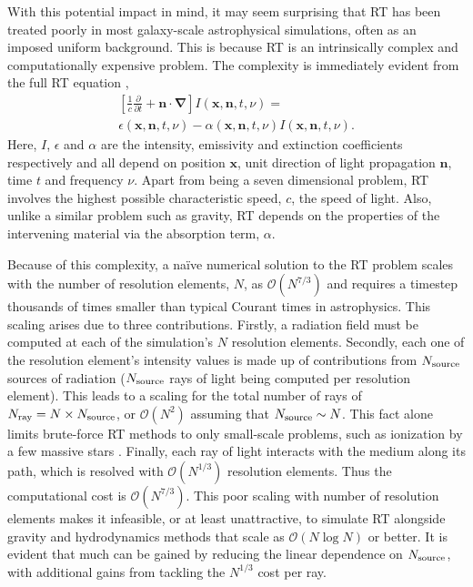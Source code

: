 \documentclass[fleq,usenatbib]{mnras}
\newcommand{\bigO}[1]{\mathcal{O}\left(#1\right)}
\newcommand{\NS}{N_{\rm source}}
\newcommand{\NR}{N_{\rm ray}}
\begin{document}
With this potential impact in mind, it may seem surprising that RT has been 
treated poorly in most galaxy-scale astrophysical simulations, often as an 
imposed uniform background. This is because RT is an intrinsically complex and 
computationally expensive problem. The complexity is immediately evident from 
the full RT equation \citep[e.g.][]{mihalasMihalas84},
\begin{eqnarray} \label{eqn:classicrt}
\left[ \frac{1}{c} \frac{\partial}{\partial t} + \mathbf{n \cdot \nabla}
 \right] I\left(\mathbf{x}, \mathbf{n}, t, \nu\right) = \nonumber \\
\epsilon\left(\mathbf{x}, \mathbf{n}, t, \nu\right) - 
\alpha\left(\mathbf{x}, \mathbf{n}, t, \nu\right) 
I\left(\mathbf{x}, \mathbf{n}, t, \nu\right).
\end{eqnarray} 
Here, $I$, $\epsilon$ and $\alpha$ are the intensity, emissivity and 
extinction coefficients respectively and all depend on position $\mathbf{x}$, 
unit direction of light propagation $\mathbf{n}$, time $t$ and frequency 
$\nu$. Apart from being a seven dimensional problem, RT involves the highest 
possible characteristic speed, $c$, the speed of light. Also, unlike a similar
problem such as gravity, RT depends on the properties of the 
intervening material via the absorption term, $\alpha$.

Because of this complexity, a na\"ive numerical solution to the RT problem 
scales with the number of resolution elements, $N$, as $\bigO{N^{7/3}}$ and 
requires a timestep thousands of times smaller than typical Courant times in 
astrophysics. This scaling arises due to three contributions. Firstly, a 
radiation field must be computed at each of the simulation's $N$ resolution 
elements. Secondly, each one of the resolution element's intensity values is 
made up of contributions from $\NS$ sources of radiation ($\NS$ rays of light 
being computed per resolution element). This leads to a scaling for the total 
number of rays of $\NR = N \times \NS$, or $\bigO{N^2}$ assuming that $\NS 
\sim N$. This fact alone limits brute-force RT methods to only small-scale 
problems, such as ionization by a few massive stars \citep[e.g.][]{howard16, 
howard17}. Finally, each ray of light interacts with the medium along its 
path, which is resolved with $\bigO{N^{1/3}}$ resolution elements. Thus the 
computational cost is $\bigO{N^{7/3}}$. This poor scaling with number of 
resolution elements makes it infeasible, or at least unattractive, to simulate 
RT alongside gravity and hydrodynamics methods that scale as $\bigO{N\log N}$ 
or better. It is evident that much can be gained by reducing the linear 
dependence on $\NS$, with additional gains from tackling the $N^{1/3}$ cost 
per ray.
\end{document}
